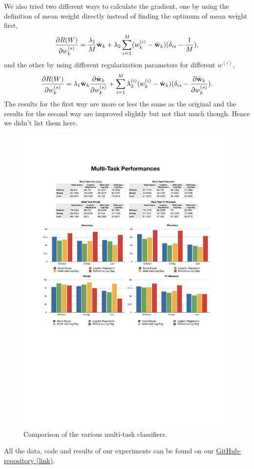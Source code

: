 We also tried two different ways to calculate the gradient, one by using the definition of mean weight directly instead of finding the optimum of mean weight first, 
\begin{align*}
\frac{\partial R(W)}{\partial w_k^{(s)}} = \frac{\lambda_1}{M} \bar{\textbf{w}}_k + \lambda_2 \sum_{i=1}^{M}(w_k^{(i)} - \bar{\textbf{w}}_k)(\delta_{is} - \frac{1}{M}),
\end{align*}
and the other by using different regularization parameters for different $w^{(i)}$,
\begin{align*}
\frac{\partial R(W)}{\partial w_k^{(s)}} = \lambda_1 \bar{\textbf{w}}_k\frac{\partial \bar{\textbf{w}}_k}{\partial w_k^{(s)}} + \sum_{i=1}^{M}\lambda_2^{(i)}(w_k^{(i)} - \bar{\textbf{w}}_k)(\delta_{is} - \frac{\partial\bar{\textbf{w}}_k}{\partial w_k^{(s)}}). 
\end{align*}
The results for the first way are more or less the same as the original and the results for the second way are improved slightly but not that much though. Hence we didn't list them here. 
%
\begin{figure}
    \centering
    \setlength{\tabcolsep}{0.0130\linewidth}
    \includegraphics[width=\linewidth]{figures/MultiTask}
    \caption{Comparison of the various multi-task classifiers.%
      \label{fig:multitask}}
\end{figure}


All the data, code and results of our experiments can be found on our 
\href{https://github.com/johnnyyan/515project}{GitHub-repository (link)}.

